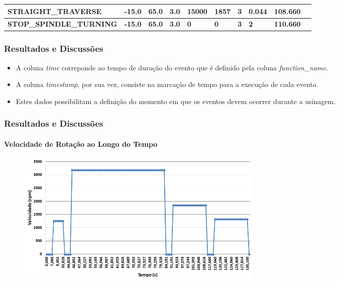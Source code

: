 \documentclass[aspectratio=169]{beamer}
\begin{document}
{\begin{frame}[fragile]
\begin{tabular}{|l|l|l|l|l|l|l|l|l|l|}
      \tiny{\bfseries{STRAIGHT\_TRAVERSE}} & 
      \tiny{\bfseries{-15.0}} & 
      \tiny{\bfseries{65.0}} & 
      \tiny{\bfseries{3.0}} & 
      \tiny{\bfseries{15000}} & 
      \tiny{\bfseries{1857}} & 
      \tiny{\bfseries{3}} & 
      \tiny{\bfseries{0.044}} & 
      \tiny{\bfseries{108.660}} \\
      \hline

      \tiny{\bfseries{STOP\_SPINDLE\_TURNING}} & 
      \tiny{\bfseries{-15.0}} & 
      \tiny{\bfseries{65.0}} & 
      \tiny{\bfseries{3.0}} & 
      \tiny{\bfseries{0}} & 
      \tiny{\bfseries{0}} & 
      \tiny{\bfseries{3}} & 
      \tiny{\bfseries{2}} & 
      \tiny{\bfseries{110.660}} \\
      \hline

  \end{tabular}

\end{frame}


\begin{frame}[fragile]
  \frametitle{Resultados e Discussões}

  \begin{itemize}
    \item A coluna \emph{time} correponde ao tempo de duração do evento 
    que é definido pela coluna \emph{function\_name}.
    \item A coluna \emph{timestamp}, por sua vez, consiste na 
    marcação de tempo para a execução de cada evento.
    \item Estes dados possibilitam a definição do momento em que os 
          eventos devem ocorrer durante a usinagem.
  \end{itemize}

\end{frame}


\begin{frame}[fragile]
  \frametitle{Resultados e Discussões}
  \framesubtitle{Velocidade de Rotação ao Longo do Tempo}

  \begin{figure}[H]
    \centering
    \includegraphics[width=120mm]{images/spindle-speed-values-graph.png}
  \end{figure}


\end{frame}}
\end{document}
